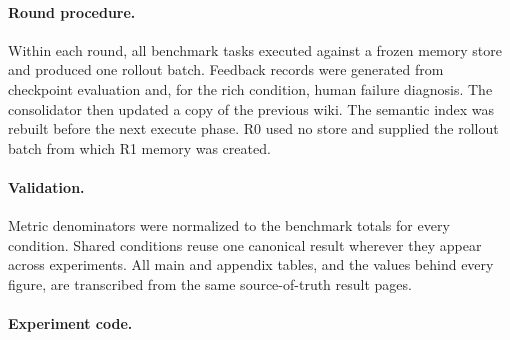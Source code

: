 \begin{table}[t]
\caption{\textbf{API cost of one complete 127-task evaluation batch.}
Execution is the task-execution phase, retrieval is the memory-query phase, and
 total is their sum. Consolidation costs are reported separately in
the experiment tables. Evaluator, embedding, host-compute, and
human-feedback costs are outside these values.}
\label{tab:execution-cost}
\centering
\small
{}
\end{table}

\paragraph{Round procedure.}
Within each round, all benchmark tasks executed against a frozen memory store and
produced one rollout batch. Feedback records were generated from checkpoint
evaluation and, for the rich condition, human failure diagnosis. The
consolidator then updated a copy of the previous wiki. The semantic index was
rebuilt before the next execute phase. R0 used no store and supplied the rollout
batch from which R1 memory was created.

\paragraph{Validation.}
Metric denominators were normalized to the benchmark totals for every
condition. Shared conditions reuse one canonical result wherever they appear
across experiments. All main and appendix tables, and the values behind
every figure, are transcribed from the same source-of-truth result pages.

\paragraph{Experiment code.}
